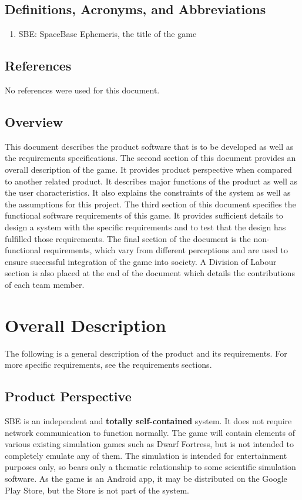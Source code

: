 \documentclass[]{article}
\begin{document}
\subsection{Definitions, Acronyms, and Abbreviations}
\label{sub:definitions_acronyms_and_abbreviations}
\begin{enumerate}
	\item SBE: SpaceBase Ephemeris, the title of the game
\end{enumerate}

\subsection{References}
\label{sub:references}
	No references were used for this document.

\subsection{Overview}
\label{sub:overview}
	This document describes the product software that is to be developed as well as the requirements specifications. The second section of this document provides an overall description of the game. It provides product perspective when compared to another related product. It describes major functions of the product as well as the user characteristics. It also explains the constraints of the system as well as the assumptions for this project. The third section of this document specifies the functional software requirements of this game. It provides sufficient details to design a system with the specific requirements and to test that the design has fulfilled those requirements. The final section of the document is the non-functional requirements, which vary from different perceptions and are used to ensure successful integration of the game into society. A Division of Labour section is also placed at the end of the document which details the contributions of each team member.


\section{Overall Description}
\label{sec:overall_description}

The following is a general description of the product and its requirements. For more specific requirements, see the requirements sections.

\subsection{Product Perspective}
\label{sub:product_perspective}
	SBE is an independent and \textbf{totally self-contained} system. It does not require network communication to function normally. The game will contain elements of various existing simulation games such as Dwarf Fortress, but is not intended to completely emulate any of them. The simulation is intended for entertainment purposes only, so bears only a thematic relationship to some scientific simulation software. As the game is an Android app, it may be distributed on the Google Play Store, but the Store is not part of the system. 
\end{document}
